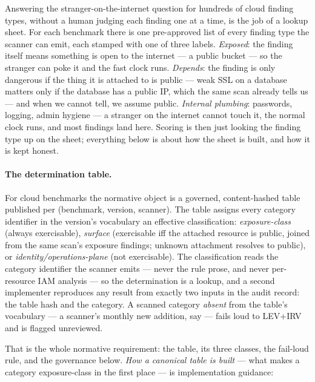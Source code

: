 \documentclass[11pt]{article}
\begin{document}
\begin{plain}
Answering the stranger-on-the-internet question for hundreds of cloud finding types,
without a human judging each finding one at a time, is the job of a lookup sheet.
For each benchmark there is one pre-approved list of every finding type the scanner
can emit, each stamped with one of three labels. \emph{Exposed}: the finding itself
means something is open to the internet --- a public bucket --- so the stranger can
poke it and the fast clock runs. \emph{Depends}: the finding is only dangerous if the
thing it is attached to is public --- weak SSL on a database matters only if the
database has a public IP, which the same scan already tells us --- and when we cannot
tell, we assume public. \emph{Internal plumbing}: passwords, logging, admin hygiene
--- a stranger on the internet cannot touch it, the normal clock runs, and most
findings land here. Scoring is then just looking the finding type up on the sheet;
everything below is about how the sheet is built, and how it is kept honest.
\end{plain}

\paragraph{The determination table.} For cloud benchmarks the normative object is a
governed, content-hashed table published per (benchmark, version, scanner). The table
assigns every category identifier in the version's vocabulary an effective
classification: \emph{exposure-class} (always exercisable), \emph{surface} (exercisable
iff the attached resource is public, joined from the same scan's exposure findings;
unknown attachment resolves to public), or
\emph{identity/operations-plane} (not exercisable). The classification reads the
category identifier the scanner emits --- never the rule prose, and never per-resource
IAM analysis --- so the determination is a lookup, and a second implementer reproduces
any result from exactly two inputs in the audit record: the table hash and the category.
A scanned category \emph{absent} from the table's vocabulary --- a scanner's monthly
new addition, say --- fails loud to LEV+IRV and is flagged unreviewed.

That is the whole normative requirement: the table, its three classes, the fail-loud
rule, and the governance below. \emph{How a canonical table is built} --- what makes a
category exposure-class in the first place --- is implementation guidance:
\end{document}
